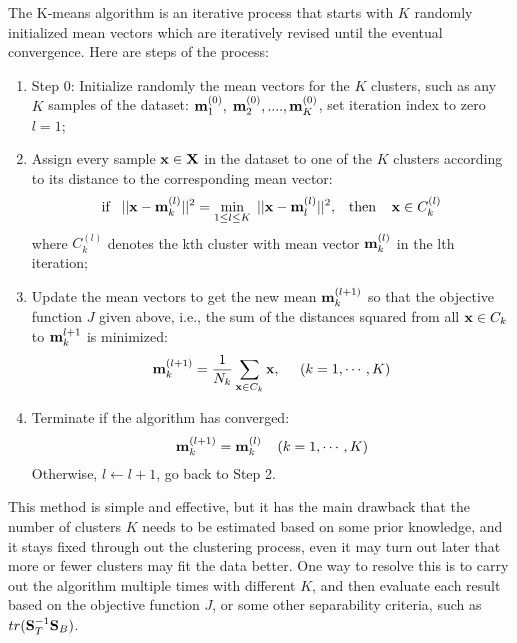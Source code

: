 \documentclass{article}
\begin{document}
The K-means algorithm is an iterative process that starts with $K$ randomly
initialized mean vectors which are iteratively revised until the eventual
convergence. Here are steps of the process:

\begin{enumerate}

\item Step 0: Initialize randomly the mean vectors for the $K$ clusters,
  such as any $K$ samples of the dataset:
  ${\bf m}_1^{(0)},\;{\bf m}_2^{(0)},....,{\bf m}_K^{(0)}$,
  set iteration index to zero $l=1$;

\item Assign every sample ${\bf x}\in{\bf X}$ in the dataset to one of the
  $K$ clusters according to its distance to the corresponding mean vector:
  \begin{equation}
    \mbox{if}\;\;\;
    ||{\bf x}-{\bf m}_k^{(l)}||^2=\min_{1\le l\le K} \;||{\bf x}-{\bf m}_l^{(l)}||^2,
    \;\;\;\mbox{then}\;\;\;\;{\bf x} \in C_k^{(l)}
  \end{equation}
  where $C_k^{(l)}$ denotes the kth cluster with mean vector ${\bf m}_k^{(l)}$
  in the lth iteration;

\item Update the mean vectors to get the new mean ${\bf m}_k^{(l+1)}$ 
  so that the objective function $J$ given above, i.e., the sum of 
  the distances squared from all ${\bf x}\in C_k$ to ${\bf m}_k^{l+1}$ 
  is minimized:
  \begin{equation} 
    {\bf m}_k^{(l+1)}=\frac{1}{N_k} \sum_{{\bf x} \in C_k} {\bf x},\;\;\;\;\;
    (k=1,\cdots,K)	
  \end{equation}   

\item Terminate if the algorithm has converged:
  \begin{equation} 
    {\bf m}_k^{(l+1)}={\bf m}_k^{(l)}\;\;\;\;(k=1,\cdots,K)	
  \end{equation}
  Otherwise, $l \leftarrow l+1 $, go back to Step 2.
\end{enumerate}

This method is simple and effective, but it has the main drawback that the 
number of clusters $K$ needs to be estimated based on some prior knowledge, 
and it stays fixed through out the clustering process, even it may turn out 
later that more or fewer clusters may fit the data better. One way to resolve
this is to carry out the algorithm multiple times with different $K$, and
then evaluate each result based on the objective function $J$, or some 
other separability criteria, such as $tr({\bf S}_T^{-1}{\bf S}_B)$.
\end{document}
